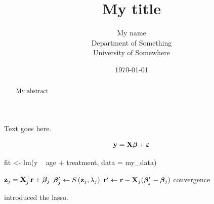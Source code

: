 \documentclass[11pt]{article}
\title{My title}
\author{My name \\ Department of Something \\ University of Somewhere}
\date{\today}
\begin{document}
\maketitle

\begin{abstract}
  My abstract
\end{abstract}

Text goes here.

$$ \mathbf{y} = \mathbf{X}\boldsymbol{\beta} + \boldsymbol{\varepsilon} $$

\begin{code}
  fit <- lm(y ~ age + treatment, data = my_data)
\end{code}

\begin{algorithm}
  \caption{\label{alg:gd-lasso} Group descent algorithm for the group lasso}
  \begin{algorithmic}
    \Repeat
    \State $\mathbf{z}_j = \mathbf{X}_j ^{\scriptscriptstyle\top} \mathbf{r} + \boldsymbol{\beta}_j$
    \State $\boldsymbol{\beta}_j' \gets S\left(\mathbf{z}_j,\lambda_j\right)$
    \State $\mathbf{r}' \gets \mathbf{r} - \mathbf{X}_j(\boldsymbol{\beta}_j'-\boldsymbol{\beta}_j)$
    \EndFor
    \Until convergence
  \end{algorithmic}
\end{algorithm}

\citet{Tibshirani1996} introduced the lasso.



\end{document}
